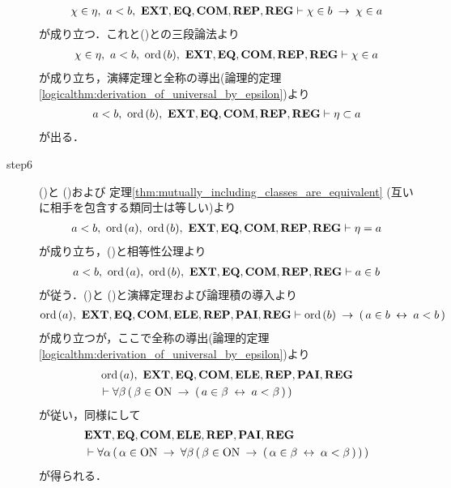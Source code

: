 \begin{prf}
\begin{description}
				\begin{align}
					\chi \in \eta,\ a < b,\ \EXTAX,\EQAX,\COMAX,\REPAX,\REGAX \vdash \chi \in b \rarrow \chi \in a
				\end{align}
				が成り立つ．これと()との三段論法より
				\begin{align}
					\chi \in \eta,\ a < b,\ \ord{b},\ \EXTAX,\EQAX,\COMAX,\REPAX,\REGAX \vdash \chi \in a
				\end{align}
				が成り立ち，演繹定理と全称の導出(論理的定理\ref{logicalthm:derivation_of_universal_by_epsilon})より
				\begin{align}
					a < b,\ \ord{b},\ \EXTAX,\EQAX,\COMAX,\REPAX,\REGAX \vdash \eta \subset a
					\label{fom:element_and_proper_subset_correspond_19}
				\end{align}
				が出る．
			
			\item[step6] ()と
				()および
				定理\ref{thm:mutually_including_classes_are_equivalent} (互いに相手を包含する類同士は等しい)より
				\begin{align}
					a < b,\ \ord{a},\ \ord{b},\ \EXTAX,\EQAX,\COMAX,\REPAX,\REGAX \vdash \eta = a
				\end{align}
				が成り立ち，()と相等性公理より
				\begin{align}
					a < b,\ \ord{a},\ \ord{b},\ \EXTAX,\EQAX,\COMAX,\REPAX,\REGAX \vdash a \in b
					\label{fom:element_and_proper_subset_correspond_20}
				\end{align}
				が従う．()と
				()と演繹定理および論理積の導入より
				\begin{align}
					\ord{a},\ \EXTAX,\EQAX,\COMAX,\ELEAX,\REPAX,\PAIAX,\REGAX \vdash 
					\ord{b} \rarrow (\, a \in b \lrarrow a < b\, )
				\end{align}
				が成り立つが，ここで全称の導出(論理的定理\ref{logicalthm:derivation_of_universal_by_epsilon})より
				\begin{align}
					&\ord{a},\ \EXTAX,\EQAX,\COMAX,\ELEAX,\REPAX,\PAIAX,\REGAX \\
					&\vdash \forall \beta\, (\, \beta \in \ON \rarrow (\, a \in \beta \lrarrow a < \beta\, )\, )
				\end{align}
				が従い，同様にして
				\begin{align}
					&\mbox{{\bf EXT}},\mbox{{\bf EQ}},\mbox{\bf COM},\mbox{{\bf ELE}},\mbox{{\bf REP}},\mbox{{\bf PAI}},\mbox{{\bf REG}} \\
					&\vdash \forall \alpha\, (\, \alpha \in \mathrm{ON} \hspace{0.25em}\rightarrow\hspace{0.25em}
					\forall \beta\, (\, \beta \in \mathrm{ON} \hspace{0.25em}\rightarrow\hspace{0.25em} (\, \alpha \in \beta \hspace{0.25em}\leftrightarrow\hspace{0.25em} \alpha < \beta\, )\, )\, )
				\end{align}
				が得られる．
				\QED
		\end{description}
	\end{prf}
	
